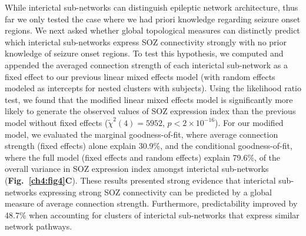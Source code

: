 While interictal sub-networks can distinguish epileptic network architecture, thus far we only tested the case where we had priori knowledge regarding seizure onset regions. We next asked whether global topological measures can distinctly predict which interictal sub-networks express SOZ connectivity strongly with no prior knowledge of seizure onset regions. To test this hypothesis, we computed and appended the averaged connection strength of each interictal sub-network as a fixed effect to our previous linear mixed effects model (with random effects modeled as intercepts for nested clusters with subjects). Using the likelihood ratio test, we found that the modified linear mixed effects model is significantly more likely to generate the observed values of SOZ expression index than the previous model without fixed effects  ($\tilde{\chi}^2(4)=5952$, $p<2\times10^{-16}$). For our modified model, we evaluated the marginal goodness-of-fit, where average connection strength (fixed effects) alone explain 30.9\%, and the conditional goodness-of-fit, where the full model (fixed effects and random effects) explain 79.6\%, of the overall variance in SOZ expression index amongst interictal sub-networks (\textbf{Fig.~\ref{ch4:fig4}C}). These results presented strong evidence that interictal sub-networks expressing strong SOZ connectivity can be predicted by a global measure of average connection strength. Furthermore, predictability improved by 48.7\% when accounting for clusters of interictal sub-networks that express similar network pathways.

